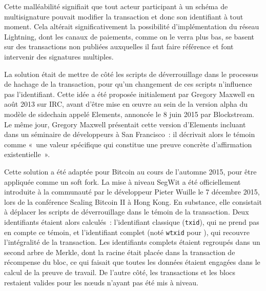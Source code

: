 Cette malléabilité signifiait que tout acteur participant à un schéma de multisignature pouvait modifier la transaction et donc son identifiant à tout moment. Cela altérait significativement la possibilité d'implémentation du réseau Lightning, dont les canaux de paiements, comme on le verra plus bas, se basent sur des transactions non publiées auxquelles il faut faire référence et font intervenir des signatures multiples.

La solution était de mettre de côté les scripts de déverrouillage dans le processus de hachage de la transaction, pour qu'un changement de ces scripts n'influence pas l'identifiant. Cette idée a été proposée initialement par Gregory Maxwell en août 2013 sur IRC, avant d'être mise en œuvre au sein de la version alpha du modèle de sidechain appelé Elements, annoncée le 8 juin 2015 par Blockstream. Le même jour, Gregory Maxwell présentait cette version d'Elements incluant  dans un séminaire de développeurs à San Francisco~: il décrivait alors le témoin comme «~une valeur spécifique qui constitue une preuve concrète d'affirmation existentielle~».


Cette solution a été adaptée pour Bitcoin au cours de l'automne 2015, pour être appliquée comme un soft fork. La mise à niveau SegWit a été officiellement introduite à la communauté par le développeur Pieter Wuille le 7 décembre 2015, lors de la conférence Scaling Bitcoin \textsc{II} à Hong Kong. En substance, elle consistait à déplacer les scripts de déverrouillage dans le témoin de la transaction. Deux identifiants étaient alors calculés~: l'identifiant classique (\texttt{txid}), qui ne prend pas en compte ce témoin, et l'identifiant complet (noté \texttt{wtxid} pour ), qui recouvre l'intégralité de la transaction. Les identifiants complets étaient regroupés dans un second arbre de Merkle, dont la racine était placée dans la transaction de récompense du bloc, ce qui faisait que toutes les données étaient engagées dans le calcul de la preuve de travail. De l'autre côté, les transactions et les blocs restaient valides pour les nœuds n'ayant pas été mis à niveau.

